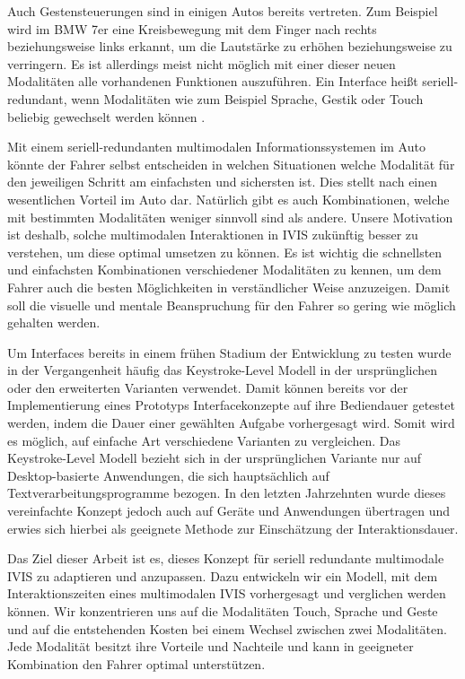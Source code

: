 Auch Gestensteuerungen sind in einigen Autos bereits vertreten.
Zum Beispiel wird im BMW 7er eine Kreisbewegung mit dem Finger nach rechts beziehungsweise links erkannt, um die Lautstärke zu erhöhen beziehungsweise zu verringern. 
Es ist allerdings meist nicht möglich mit einer dieser neuen Modalitäten alle vorhandenen Funktionen auszuführen.
Ein Interface heißt seriell-redundant, wenn Modalitäten wie zum Beispiel Sprache, Gestik oder Touch beliebig gewechselt werden können \citep{neuss_2001}. 

Mit einem seriell-redundanten multimodalen Informationssystemen im Auto könnte der Fahrer selbst entscheiden in welchen Situationen welche Modalität für den jeweiligen Schritt am einfachsten und sichersten ist.
Dies stellt nach \citet{Muller_2011} einen wesentlichen Vorteil im Auto dar.
Natürlich gibt es auch Kombinationen, welche mit bestimmten Modalitäten weniger sinnvoll sind als andere.
Unsere Motivation ist deshalb, solche multimodalen Interaktionen in IVIS zukünftig besser zu verstehen, um diese optimal umsetzen zu können.
Es ist wichtig die schnellsten und einfachsten Kombinationen verschiedener Modalitäten zu kennen, um dem Fahrer auch die besten Möglichkeiten in verständlicher Weise anzuzeigen.
Damit soll die visuelle und mentale Beanspruchung für den Fahrer so gering wie möglich gehalten werden. 

Um Interfaces bereits in einem frühen Stadium der Entwicklung zu testen wurde in der Vergangenheit häufig das Keystroke-Level Modell in der ursprünglichen oder den erweiterten Varianten verwendet.
Damit können bereits vor der Implementierung eines Prototyps Interfacekonzepte auf ihre Bediendauer getestet werden, indem die Dauer einer gewählten Aufgabe vorhergesagt wird.
Somit wird es möglich, auf einfache Art verschiedene Varianten zu vergleichen.
Das Keystroke-Level Modell bezieht sich in der ursprünglichen Variante nur auf Desktop-basierte Anwendungen, die sich hauptsächlich auf Textverarbeitungsprogramme bezogen.
In den letzten Jahrzehnten wurde dieses vereinfachte Konzept jedoch auch auf Geräte und Anwendungen übertragen und erwies sich hierbei als geeignete Methode zur Einschätzung der Interaktionsdauer. 

Das Ziel dieser Arbeit ist es, dieses Konzept für seriell redundante multimodale IVIS zu adaptieren und anzupassen.
Dazu entwickeln wir ein Modell, mit dem Interaktionszeiten eines multimodalen IVIS vorhergesagt und verglichen werden können.
Wir konzentrieren uns auf die Modalitäten Touch, Sprache und Geste und auf die entstehenden Kosten bei einem Wechsel zwischen zwei Modalitäten.
Jede Modalität besitzt ihre Vorteile und Nachteile und kann in geeigneter Kombination den Fahrer optimal unterstützen.

